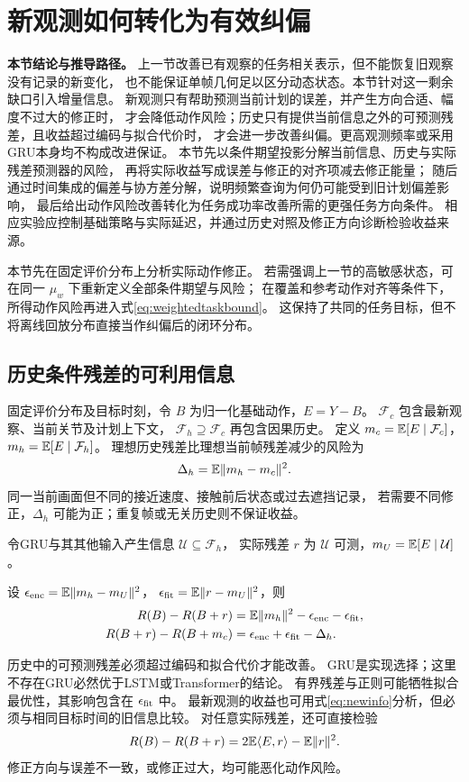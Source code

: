\section{新观测如何转化为有效纠偏}
\noindent\textbf{本节结论与推导路径。}
上一节改善已有观察的任务相关表示，但不能恢复旧观察没有记录的新变化，
也不能保证单帧几何足以区分动态状态。本节针对这一剩余缺口引入增量信息。
新观测只有帮助预测当前计划的误差，并产生方向合适、幅度不过大的修正时，
才会降低动作风险；历史只有提供当前信息之外的可预测残差，且收益超过编码与拟合代价时，
才会进一步改善纠偏。更高观测频率或采用GRU本身均不构成改进保证。
本节先以条件期望投影分解当前信息、历史与实际残差预测器的风险，
再将实际收益写成误差与修正的对齐项减去修正能量；
随后通过时间集成的偏差与协方差分解，说明频繁查询为何仍可能受到旧计划偏差影响，
最后给出动作风险改善转化为任务成功率改善所需的更强任务方向条件。
相应实验应控制基础策略与实际延迟，并通过历史对照及修正方向诊断检验收益来源。

本节先在固定评价分布上分析实际动作修正。
若需强调上一节的高敏感状态，可在同一 $\mu_w$ 下重新定义全部条件期望与风险；
在覆盖和参考动作对齐等条件下，所得动作风险再进入式\eqref{eq:weightedtaskbound}。
这保持了共同的任务目标，但不将离线回放分布直接当作纠偏后的闭环分布。

\subsection{历史条件残差的可利用信息}
固定评价分布及目标时刻，令 $B$ 为归一化基础动作，$E=Y-B$。
$\mathcal F_c$ 包含最新观察、当前关节及计划上下文，
$\mathcal F_h\supseteq\mathcal F_c$ 再包含因果历史。
定义 $m_c=\mathbb E[E\mid\mathcal F_c]$，$m_h=\mathbb E[E\mid\mathcal F_h]$。
理想历史残差比理想当前帧残差减少的风险为
\begin{equation}
 \Delta_h=\mathbb E\lVert m_h-m_c\rVert^2.
 \label{eq:historygain}
\end{equation}
同一当前画面但不同的接近速度、接触前后状态或过去遮挡记录，
若需要不同修正，$\Delta_h$ 可能为正；重复帧或无关历史则不保证收益。

令GRU与其其他输入产生信息 $\mathcal U\subseteq\mathcal F_h$，
实际残差 $r$ 为 $\mathcal U$ 可测，$m_U=\mathbb E[E\mid\mathcal U]$。
\begin{proposition}[历史编码与残差收益]
设 $\epsilon_{\rm enc}=\mathbb E\lVert m_h-m_U\rVert^2$，
$\epsilon_{\rm fit}=\mathbb E\lVert r-m_U\rVert^2$，则
\begin{align}
 R(B)-R(B+r)
 &=\mathbb E\lVert m_h\rVert^2-\epsilon_{\rm enc}-\epsilon_{\rm fit},\label{eq:resgain}\\
 R(B+r)-R(B+m_c)
 &=\epsilon_{\rm enc}+\epsilon_{\rm fit}-\Delta_h.\label{eq:rescompare}
\end{align}
\end{proposition}
历史中的可预测残差必须超过编码和拟合代价才能改善。
GRU是实现选择；这里不存在GRU必然优于LSTM或Transformer的结论。
有界残差与正则可能牺牲拟合最优性，其影响包含在 $\epsilon_{\rm fit}$ 中。
最新观测的收益也可用式\eqref{eq:newinfo}分析，但必须与相同目标时间的旧信息比较。
对任意实际残差，还可直接检验
\begin{equation}
 R(B)-R(B+r)=2\mathbb E\langle E,r\rangle-\mathbb E\lVert r\rVert^2.
 \label{eq:alignment}
\end{equation}
修正方向与误差不一致，或修正过大，均可能恶化动作风险。

